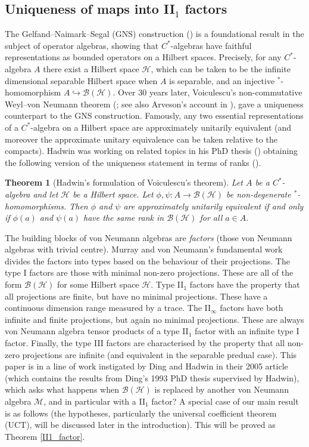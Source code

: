 \documentclass[reqno]{amsart}
\newtheorem*{theorem*}{Theorem}
\theoremstyle{definition}
\theoremstyle{remark}
\numberwithin{equation}{section}
\theoremstyle{definition}
\begin{document}
\subsection*{Uniqueness of maps into II$_1$ factors} The Gelfand--Naimark--Segal (GNS) construction (\cite{GN,Segal:GNS}) is a foundational result in the subject of operator algebras, showing that $C^*$-algebras have faithful representations as bounded operators on a Hilbert spaces. Precisely, for any $C^*$-algebra $A$ there exist a Hilbert space $\mathcal H$, which can be taken to be the infinite dimensional separable Hilbert space when $A$ is separable, and an injective $^*$-homomorphism $A\hookrightarrow\mathcal B(\mathcal H)$.  Over 30 years later, Voiculescu's non-commutative Weyl--von Neumann theorem (\cite[Theorem 1.5]{Voiculescu}; see also Arveson's account in \cite{Arveson:DJM}), gave a uniqueness counterpart to the GNS construction. Famously, any two essential representations of a $C^*$-algebra on a Hilbert space are approximately unitarily equivalent (and moreover the approximate unitary equivalence can be taken relative to the compacts).  Hadwin was working on related topics in his PhD thesis (\cite{Hadwin:thesis}) obtaining the following version of the uniqueness statement in terms of ranks (\cite[Theorem 2.5]{Hadwin:TAMS}).

\begin{theorem*}[Hadwin's formulation of Voiculescu's theorem] Let $A$ be a $C^*$-algebra and let $\mathcal H$ be a Hilbert space. Let $\phi,\psi\colon A\to\mathcal B(\mathcal H)$ be non-degenerate $^*$-homomorphisms. Then $\phi$ and $\psi$ are approximately unitarily equivalent if and only if $\phi(a)$ and $\psi(a)$ have the same rank in $\mathcal B(\mathcal H)$ for all $a\in A$.
\end{theorem*}

The building blocks of von Neumann algebras are \emph{factors} (those von Neumann algebras with trivial centre). Murray and von Neumann's fundamental work divides the factors into types based on the behaviour of their projections. The type I factors are those with minimal non-zero projections. These are all of the form $\mathcal B(\mathcal H)$ for some Hilbert space $\mathcal H$. Type II$_1$ factors have the property that all projections are finite, but have no minimal projections. These have a continuous dimension range measured by a trace. The II$_\infty$ factors have both infinite and finite projections, but again no minimal projections. These are always von Neumann algebra tensor products of a type II$_1$ factor with an infinite type I factor. Finally, the type III factors are characterised by the property that all non-zero projections are infinite (and equivalent in the separable predual case). This paper is in a line of work instigated by Ding and Hadwin in their 2005 article \cite{DingHadwin} (which contains the results from Ding's 1993 PhD thesis \cite{Ding:Thesis} supervised by Hadwin), which asks what happens when $\mathcal B(\mathcal H)$ is replaced by another von Neumann algebra $\mathcal M$, and in particular with a II$_1$ factor?  A special case of our main result is as follows (the hypotheses, particularly the universal coefficient theorem (UCT), will be discussed later in the introduction). This will be proved as Theorem \ref{II1_factor}. 
\end{document}
